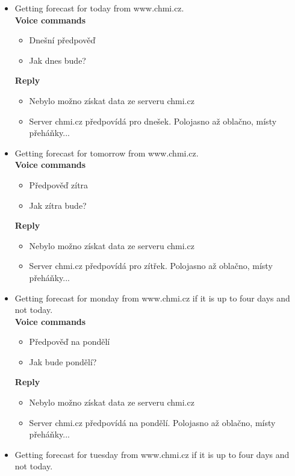\begin{itemize}
    \item Getting forecast for today from www.chmi.cz.\\
    \textbf{Voice commands}
    \begin{itemize}
        \item Dnešní předpověď
        \item Jak dnes bude?
    \end{itemize}
    \textbf{Reply}
    \begin{itemize}
        \item Nebylo možno získat data ze serveru chmi.cz
        \item Server chmi.cz předpovídá pro dnešek. Polojasno až oblačno, místy přeháňky...
    \end{itemize}
    \item Getting forecast for tomorrow from www.chmi.cz.\\
    \textbf{Voice commands}
    \begin{itemize}
        \item Předpověď zítra
        \item Jak zítra bude?
    \end{itemize}
    \textbf{Reply}
    \begin{itemize}
        \item Nebylo možno získat data ze serveru chmi.cz
        \item Server chmi.cz předpovídá pro zítřek. Polojasno až oblačno, místy přeháňky...
    \end{itemize}
    \item Getting forecast for monday from www.chmi.cz if it is up to four days and not today.\\
    \textbf{Voice commands}
    \begin{itemize}
        \item Předpověď na pondělí
        \item Jak bude pondělí?
    \end{itemize}
    \textbf{Reply}
    \begin{itemize}
        \item Nebylo možno získat data ze serveru chmi.cz
        \item Server chmi.cz předpovídá na pondělí. Polojasno až oblačno, místy přeháňky...
    \end{itemize}
    \item Getting forecast for tuesday from www.chmi.cz if it is up to four days and not today.\\

\end{itemize}
